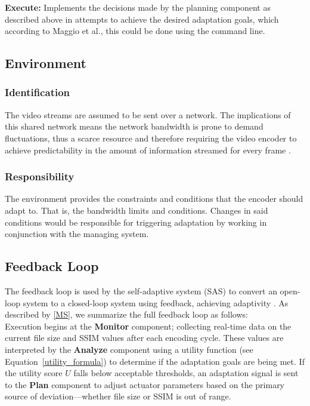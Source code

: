 \documentclass[conference]{IEEEtran}
\begin{document}
\noindent \textbf{Execute:} Implements the decisions made by the planning component as described above in attempts to achieve the desired adaptation goals, which according to Maggio et al., this could be done using the command line.

\subsection{\textbf{Environment}}
\subsubsection{\textbf{Identification}}
The video streams are assumed to be sent over a network. The implications of this shared network means the network bandwidth is prone to demand fluctuations, thus a scarce resource and therefore requiring the video encoder to achieve predictability in the amount of information streamed for every frame \cite{SAVE_pdf}.\\

\subsubsection{\textbf{Responsibility}}
The environment provides the constraints and conditions that the encoder should adapt to. That is, the bandwidth limits and conditions. Changes in said conditions would be responsible for triggering adaptation by working in conjunction with the managing system.

\subsection{\textbf{Feedback Loop}}
The feedback loop is used by the self-adaptive system (SAS) to convert an open-loop system to a closed-loop system using feedback, achieving adaptivity \cite{lecture1_pdf}. As described by \ref{MS}, we summarize the full feedback loop as follows:\\

Execution begins at the \textbf{Monitor} component; collecting real-time data on the current file size and SSIM values after each encoding cycle. These values are interpreted by the \textbf{Analyze} component using a utility function (see Equation~\ref{utility_formula}) to determine if the adaptation goals are being met. If the utility score \( U \) falls below acceptable thresholds, an adaptation signal is sent to the \textbf{Plan} component to adjust actuator parameters based on the primary source of deviation—whether file size or SSIM is out of range.\\
\end{document}
